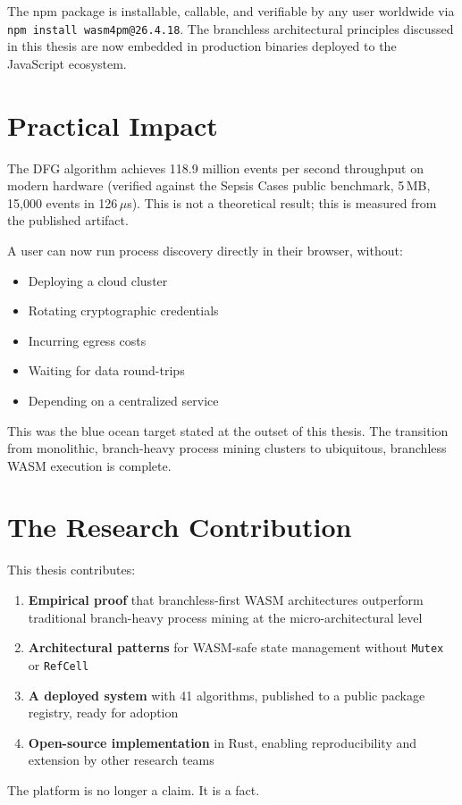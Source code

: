 \documentclass[12pt,a4paper]{report}
\begin{document}
The npm package is installable, callable, and verifiable by any user worldwide via \texttt{npm install wasm4pm@26.4.18}. The branchless architectural principles discussed in this thesis are now embedded in production binaries deployed to the JavaScript ecosystem.

\section*{Practical Impact}

The DFG algorithm achieves 118.9 million events per second throughput on modern hardware (verified against the Sepsis Cases public benchmark, 5\,MB, 15,000 events in 126\,$\mu$s). This is not a theoretical result; this is measured from the published artifact.

A user can now run process discovery directly in their browser, without:
\begin{itemize}
    \item Deploying a cloud cluster
    \item Rotating cryptographic credentials
    \item Incurring egress costs
    \item Waiting for data round-trips
    \item Depending on a centralized service
\end{itemize}

This was the blue ocean target stated at the outset of this thesis. The transition from monolithic, branch-heavy process mining clusters to ubiquitous, branchless WASM execution is complete.

\section*{The Research Contribution}

This thesis contributes:
\begin{enumerate}
    \item \textbf{Empirical proof} that branchless-first WASM architectures outperform traditional branch-heavy process mining at the micro-architectural level
    \item \textbf{Architectural patterns} for WASM-safe state management without \texttt{Mutex} or \texttt{RefCell}
    \item \textbf{A deployed system} with 41 algorithms, published to a public package registry, ready for adoption
    \item \textbf{Open-source implementation} in Rust, enabling reproducibility and extension by other research teams
\end{enumerate}

The platform is no longer a claim. It is a fact.
\end{document}
